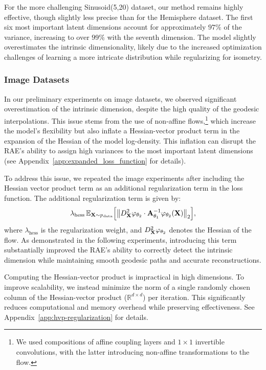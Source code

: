     For the more challenging Sinusoid(5,20) dataset, our method remains highly effective, though slightly less precise than for the Hemisphere dataset. The first six most important latent dimensions account for approximately $97\%$ of the variance, increasing to over $99\%$ with the seventh dimension. The model slightly overestimates the intrinsic dimensionality, likely due to the increased optimization challenges of learning a more intricate distribution while regularizing for isometry.

    \subsubsection{Image Datasets}\label{sec:image_datasets}


In our preliminary experiments on image datasets, we observed significant overestimation of the intrinsic dimension, despite the high quality of the geodesic interpolations. This issue stems from the use of non-affine flows,\footnote{We used compositions of affine coupling layers and $1 \times 1$ invertible convolutions, with the latter introducing non-affine transformations to the flow.} which increase the model’s flexibility but also inflate a Hessian-vector product term in the expansion of the Hessian of the model log-density. This inflation can disrupt the RAE’s ability to assign high variances to the most important latent dimensions (see Appendix~\ref{app:expanded_loss_function} for details).

To address this issue, we repeated the image experiments after including the Hessian vector product term as an additional regularization term in the loss function. The additional regularization term is given by:
\begin{align}
    \lambda_{\text{hess}} \, \mathbb{E}_{\mathbf{X} \sim p_{\text{data}}}\Bigl[\bigl\|D^2_{\mathbf{X}}\varphi_{\theta_2} \cdot \mathbf{A}_{\theta_1}^{-1} \varphi_{\theta_2}(\mathbf{X})\bigr\|_2\Bigr],
\end{align}
where $\lambda_{\text{hess}}$ is the regularization weight, and $D^2_{\mathbf{X}}\varphi_{\theta_2}$ denotes the Hessian of the flow. As demonstrated in the following experiments, introducing this term substantially improved the RAE’s ability to correctly detect the intrinsic dimension while maintaining smooth geodesic paths and accurate reconstructions.

Computing the Hessian-vector product is impractical in high dimensions. To improve scalability, we instead minimize the norm of a single randomly chosen column of the Hessian-vector product (\(\mathbb{R}^{d \times d}\)) per iteration. This significantly reduces computational and memory overhead while preserving effectiveness. See Appendix~\ref{app:hvp-regularization} for details.
    
